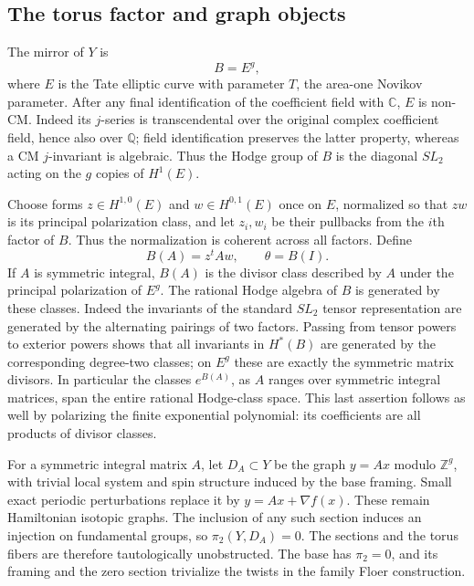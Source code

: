 \documentclass[11pt]{article}
\numberwithin{equation}{section}
\theoremstyle{definition}
\theoremstyle{remark}
\begin{document}
\subsection{The torus factor and graph objects}

The mirror of $Y$ is
\[
 B=E^g,
\]
where $E$ is the Tate elliptic curve with parameter $T$, the area-one
Novikov parameter.  After any final identification of the coefficient field
with $\mathbb C$, $E$ is non-CM.  Indeed its $j$-series is transcendental over the
original complex coefficient field, hence also over $\mathbb Q$; field
identification preserves the latter property, whereas a CM $j$-invariant
is algebraic.  Thus the Hodge group of $B$ is the diagonal $SL_2$ acting
on the $g$ copies of $H^1(E)$.

Choose forms $z\in H^{1,0}(E)$ and $w\in H^{0,1}(E)$ once on $E$,
normalized so that $zw$ is its principal polarization class, and
let $z_i,w_i$ be their pullbacks from the $i$th factor of $B$.
Thus the normalization is coherent across all factors.  Define
\begin{equation}\label{eq:matrix-divisors}
 B(A)=z^tAw,\qquad \theta=B(I).
\end{equation}
If $A$ is symmetric integral, $B(A)$ is the divisor class described by
$A$ under the principal polarization of $E^g$.  The rational Hodge algebra
of $B$ is generated by these classes.  Indeed the invariants of the
standard $SL_2$ tensor representation are generated by the alternating
pairings of two factors.  Passing from tensor powers to exterior powers
shows that all invariants in $H^*(B)$ are generated by the corresponding
degree-two classes; on $E^g$ these are exactly the symmetric matrix
divisors.  In particular the classes $e^{B(A)}$, as $A$ ranges over
symmetric integral matrices, span the entire rational Hodge-class space.
This last assertion follows as well by polarizing the finite exponential
polynomial: its coefficients are all products of divisor classes.

For a symmetric integral matrix $A$, let $D_A\subset Y$ be the graph
$y=Ax$ modulo $\mathbb Z^g$, with trivial local system and spin structure induced
by the base framing.  Small exact periodic perturbations replace it by
$y=Ax+\nabla f(x)$.  These remain Hamiltonian isotopic graphs.  The inclusion
of any such section induces an injection on fundamental groups, so
$\pi_2(Y,D_A)=0$.  The sections and the torus fibers are therefore
tautologically unobstructed.  The base has $\pi_2=0$, and its framing and
the zero section trivialize the twists in the family Floer construction.
\end{document}
